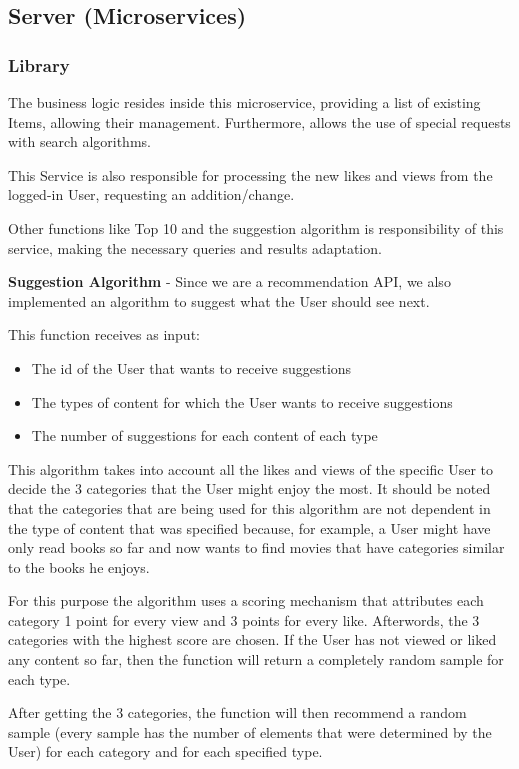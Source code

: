 \documentclass[oneside]{article}
\newcommand*\fpar{\hspace{1ex}}
\begin{document}
  \subsection{Server (Microservices)}

    \subsubsection{Library}
    \fpar The business logic resides inside this microservice, providing a list of existing Items, allowing their management. Furthermore, allows the use of special requests with search algorithms.
    \par This Service is also responsible for processing the new likes and views from the logged-in User, requesting an addition/change.
    \par Other functions like Top 10 and the suggestion algorithm is responsibility of this service, making the necessary queries and results adaptation.
    \par \textbf{Suggestion Algorithm} - Since we are a recommendation API, we also implemented an algorithm to suggest what the User should see next.
    \par This function receives as input:
    \begin{itemize}
    	\item The id of the User that wants to receive suggestions
    	\item The types of content for which the User wants to receive suggestions
    	\item The number of suggestions for each content of each type
    \end{itemize}
    \par This algorithm takes into account all the likes and views of the specific User to decide the 3 categories that the User might enjoy the most. It should be noted that the categories that are being used for this algorithm are not dependent in the type of content that was specified because, for example, a User might have only read books so far and now wants to find movies that have categories similar to the books he enjoys. 
    \par For this purpose the algorithm uses a scoring mechanism that attributes each category 1 point for every view and 3 points for every like. Afterwords, the 3 categories with the highest score are chosen. If the User has not viewed or liked any content so far, then the function will return a completely random sample for each type. 
    \par After getting the 3 categories, the function will then recommend a random sample (every sample has the number of elements that were determined by the User) for each category and for each specified type.
\end{document}
